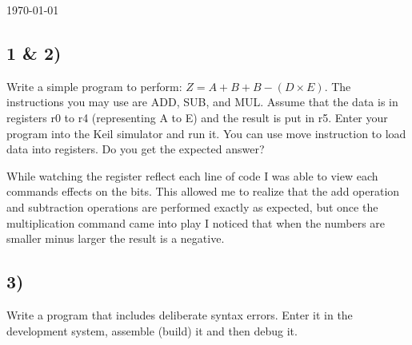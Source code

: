 \documentclass[letterpaper,12pt,titlepage]{article}
\begin{document}
\begin{titlepage}

{\large \today}\\[3cm] %


 

\vfill %

\end{titlepage}

\subsection*{1 \& 2)} Write a simple program to perform:  $Z = A+B+B-(D \times E)$. The instructions you may use are ADD, SUB, and MUL. Assume that the data is in registers r0 to r4 (representing A to E) and the result is put in r5. Enter your program into the Keil simulator and run it. You can use move instruction to load data into registers. Do you
get the expected answer? 


While watching the register reflect each line of code I was able to view each commands effects on the bits. This allowed me to realize that the add operation and subtraction operations are performed exactly as expected, but once the multiplication command came into play I noticed that when the numbers are smaller minus larger the result is a negative. 

 \newpage
\subsection*{3)} Write a program that includes deliberate syntax errors.   Enter it in the development system, assemble (build) it and then debug it. 
\end{document}
